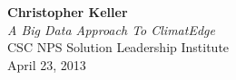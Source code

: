 \begin{titlepage}
    \vspace*{\fill}
    \begin{center}
        \textbf{\Large Christopher Keller}\\[1cm]
        \textit{A Big Data Approach To ClimatEdge\texttrademark{}}\\ [.5cm]
        CSC NPS Solution Leadership Institute\\ [.5cm]
        April 23, 2013
    \end{center}
    \vspace*{\fill}
\end{titlepage}
